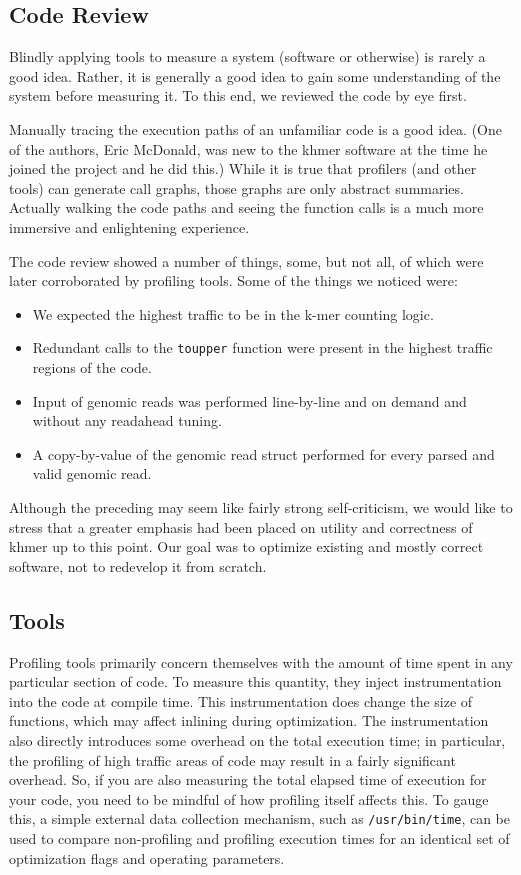 \documentclass{article}
\begin{document}
\subsection{Code Review}

Blindly applying tools to measure a system (software or otherwise) is rarely a
good idea. Rather, it is generally a good idea to gain some understanding of
the system before measuring it. To this end, we reviewed the code by eye first.

Manually tracing the execution paths of an unfamiliar code is a good idea.
(One of the authors, Eric McDonald, was new to the khmer software at the time
he joined the project and he did this.) While it is true that profilers (and
other tools) can generate call graphs, those graphs are only abstract
summaries. Actually walking the code paths and seeing the function calls is a
much more immersive and enlightening experience.

The code review showed a number of things, some, but not all, of which were
later corroborated by profiling tools. Some of the things we noticed were:

\begin{itemize}
\item We expected the highest traffic to be in the k-mer counting logic.
\item Redundant calls to the \texttt{toupper} function were present in the highest traffic 
regions of the code.
\item Input of genomic reads was performed line-by-line and on demand and without 
any readahead tuning.
\item A copy-by-value of the genomic read struct performed for every parsed and valid genomic read.
\end{itemize}

Although the preceding may seem like fairly strong self-criticism, we
would like to stress that a greater emphasis had been placed on
utility and correctness of khmer up to this point.  Our goal was to optimize
existing and mostly correct software, not to redevelop it from scratch.

\subsection{Tools}

Profiling tools primarily concern themselves with the amount of time spent in
any particular section of code. To measure this quantity, they inject
instrumentation into the code at compile time. This instrumentation does change
the size of functions, which may affect inlining during optimization.  The
instrumentation also directly introduces some overhead on the total execution
time; in particular, the profiling of high traffic areas of code may result in
a fairly significant overhead. So, if you are also measuring the total elapsed
time of execution for your code, you need to be mindful of how profiling itself
affects this. To gauge this, a simple external data collection mechanism, such
as \texttt{/usr/bin/time}, can be used to compare non-profiling and profiling
execution times for an identical set of optimization flags and operating
parameters.  
\end{document}

